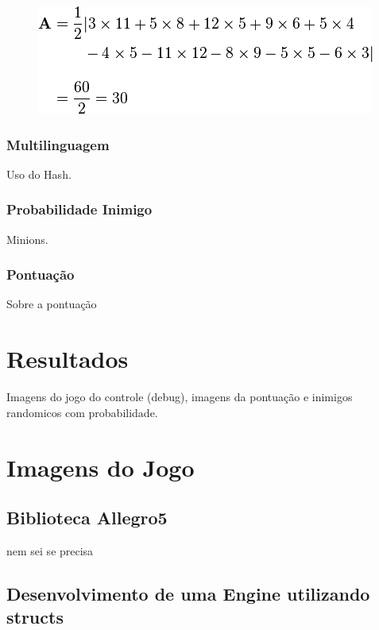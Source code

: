 \documentclass[12pt]{article}
\begin{document}
\begin{center}
\begin{figure}
\includegraphics[width=.7\textwidth]{equacao6.png}
\label{fig:fig}
\end{figure}
\end{center}

\subsubsection{Multilinguagem}

Uso do Hash.

\subsubsection{Probabilidade Inimigo}

Minions.

\subsubsection{Pontuação}

Sobre a pontuação

\section{Resultados}

Imagens do jogo do controle (debug), imagens da pontuação e inimigos randomicos com probabilidade.

\section{Imagens do Jogo}\label{sec:figs}

\subsection{Biblioteca Allegro5}

nem sei se precisa

\subsection{Desenvolvimento de uma Engine utilizando structs}
\end{document}
